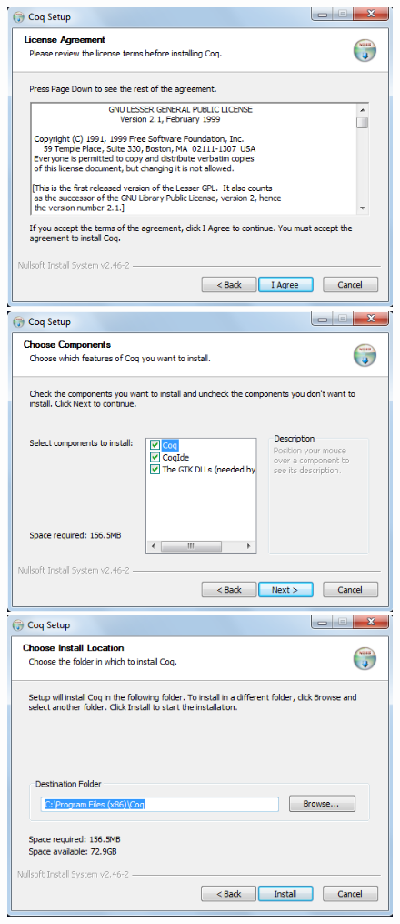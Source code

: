 \begin{flushleft}
\begin{figure}[!htb]
\includegraphics[scale=0.4]{imagens/3.png}
\includegraphics[scale=0.4]{imagens/4.png}
\includegraphics[scale=0.4]{imagens/5.png}

\end{figure}
\end{flushleft}
